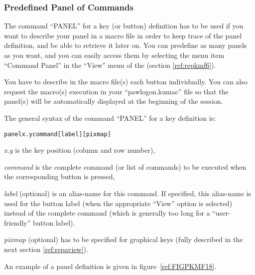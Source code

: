 \subsubsection{Predefined Panel of Commands}

The command ``PANEL'' for a key (or button) definition
has to be used if you want to describe your panel in a macro file in
order to keep trace of the panel definition, and be able to retrieve it
later on. You can predefine as many panels as you want, and you can
easily access them by selecting the menu item ``Command Panel'' in the
``View'' menu of the \EW{} (section \ref{ref:repkmf6}).
 
You have to describe in the macro file(s) each button
individually.  You can also request
the macro(s) execution in your ``pawlogon.kumac'' file
so that the panel(s) will be automatically displayed at the beginning
of the session.
 
The general syntax of the command ``PANEL''
for a key definition is:
 
\begin{alltt}
 panel x.y command [label] [pixmap]
\end{alltt}
 
\begin{UL}
\item {\it x.y} is the key position (column and row number),
\item {\it command} is the complete command (or list of commands) to
be executed when the corresponding button is pressed,
\item  {\it label} (optional) is an alias-name for this command.
If specified, this alias-name is used for the button label
(when the appropriate ``View'' option is selected) instead of the
complete command (which is generally too long for a ``user-friendly''
button label).
\item {\it pixmap} (optional) has to be specified
for graphical keys (fully described in the next section \ref{ref:repaview}).
\end{UL}
 
An example of a panel definition is given in figure~\ref{ref:FIGPKMF18}.
 
